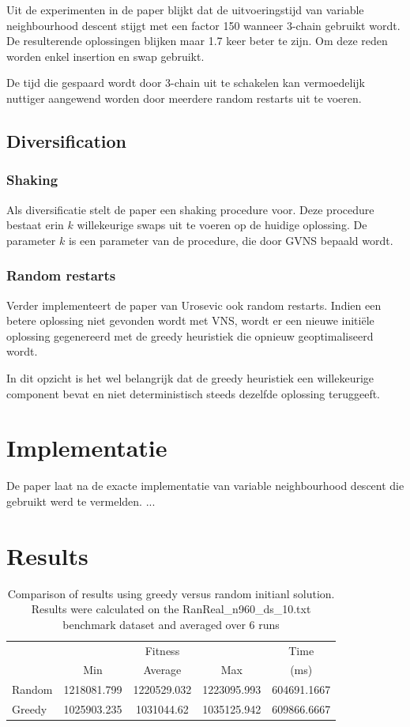 \documentclass[pdftex,12pt,a4paper]{article}
\begin{document}
Uit de experimenten in de paper blijkt dat de uitvoeringstijd van variable neighbourhood descent stijgt met een factor 150 wanneer 3-chain gebruikt wordt. 
De resulterende oplossingen blijken maar 1.7 keer beter te zijn.
Om deze reden worden enkel insertion en swap gebruikt. 

De tijd die gespaard wordt door 3-chain uit te schakelen kan vermoedelijk nuttiger aangewend worden door meerdere random restarts uit te voeren.

\subsection{Diversification}
\subsubsection{Shaking}
Als diversificatie stelt de paper een shaking procedure voor.
Deze procedure bestaat erin $k$ willekeurige swaps uit te voeren op de huidige oplossing. 
De parameter $k$ is een parameter van de procedure, die door GVNS bepaald wordt.

\subsubsection{Random restarts}
Verder implementeert de paper van Urosevic\cite{Urosevic} ook random restarts. Indien een betere oplossing niet gevonden wordt met VNS, wordt er een nieuwe initi\"ele oplossing gegenereerd met de greedy heuristiek die opnieuw geoptimaliseerd wordt.

In dit opzicht is het wel belangrijk dat de greedy heuristiek een willekeurige component bevat en niet deterministisch steeds dezelfde oplossing teruggeeft.

\section{Implementatie}
De paper laat na de exacte implementatie van variable neighbourhood descent die gebruikt werd te vermelden. ...

\section{Results}


\begin{table}
\centering
\begin{tabular}{l|c|c|c|c}
& \multicolumn{3}{c|}{Fitness} & Time\\
& Min & Average & Max & (ms) \\\hline		
Random & 1218081.799 & 1220529.032 & 1223095.993 & 604691.1667\\			
Greedy & 1025903.235 & 1031044.62 & 1035125.942 & 609866.6667
\end{tabular}
\caption{Comparison of results using greedy versus random initianl solution. Results were calculated on the RanReal\_n960\_ds\_10.txt benchmark dataset and averaged over 6 runs}
\label{table:greedyvsrandom}
\end{table}
\end{document}
